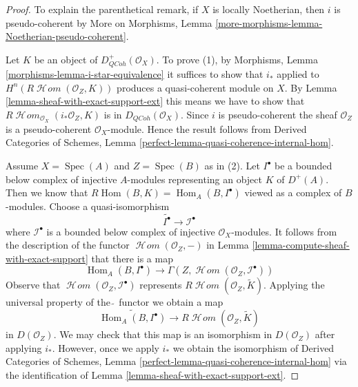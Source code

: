 \documentclass[10pt,a4paper]{amsart}
\theoremstyle{plain}
\theoremstyle{definition}
\theoremstyle{remark}
\numberwithin{equation}{subsection}
\def\Spec{\mathop{\mathrm{Spec}}}
\def\Hom{\mathop{\mathrm{Hom}}\nolimits}
\def\SheafHom{\mathop{\mathcal{H}\!\mathit{om}}\nolimits}
\def\QCoh{\mathit{QCoh}}
\begin{document}
\begin{proof}
To explain the parenthetical remark, if $X$ is locally Noetherian, then
$i$ is pseudo-coherent by
More on Morphisms, Lemma \ref{more-morphisms-lemma-Noetherian-pseudo-coherent}.

\medskip\noindent
Let $K$ be an object of $D^+_\QCoh(\mathcal{O}_X)$. To prove (1), by
Morphisms, Lemma \ref{morphisms-lemma-i-star-equivalence}
it suffices to show that $i_*$ applied to
$H^n(R\SheafHom(\mathcal{O}_Z, K))$ produces a
quasi-coherent module on $X$. By
Lemma \ref{lemma-sheaf-with-exact-support-ext}
this means we have to show that
$R\SheafHom_{\mathcal{O}_X}(i_*\mathcal{O}_Z, K)$
is in $D_\QCoh(\mathcal{O}_X)$. Since $i$ is pseudo-coherent
the sheaf $\mathcal{O}_Z$ is a pseudo-coherent $\mathcal{O}_X$-module.
Hence the result follows from
Derived Categories of Schemes, Lemma
\ref{perfect-lemma-quasi-coherence-internal-hom}.

\medskip\noindent
Assume $X = \Spec(A)$ and $Z = \Spec(B)$ as in (2).
Let $I^\bullet$ be a bounded below complex of injective $A$-modules
representing an object $K$ of $D^+(A)$.
Then we know that $R\Hom(B, K) = \Hom_A(B, I^\bullet)$ viewed
as a complex of $B$-modules. Choose a quasi-isomorphism
$$
\widetilde{I^\bullet} \longrightarrow \mathcal{I}^\bullet
$$
where $\mathcal{I}^\bullet$ is a bounded below complex of injective
$\mathcal{O}_X$-modules. It follows from the description of
the functor $\SheafHom(\mathcal{O}_Z, -)$ in
Lemma \ref{lemma-compute-sheaf-with-exact-support}
that there is a map
$$
\Hom_A(B, I^\bullet)
\longrightarrow
\Gamma(Z, \SheafHom(\mathcal{O}_Z, \mathcal{I}^\bullet))
$$
Observe that $\SheafHom(\mathcal{O}_Z, \mathcal{I}^\bullet)$
represents $R\SheafHom(\mathcal{O}_Z, \widetilde{K})$.
Applying the universal property of the $\widetilde{\ }$ functor we
obtain a map
$$
\widetilde{\Hom_A(B, I^\bullet)}
\longrightarrow
R\SheafHom(\mathcal{O}_Z, \widetilde{K})
$$
in $D(\mathcal{O}_Z)$. We may check that this map is an isomorphism in
$D(\mathcal{O}_Z)$ after applying $i_*$. However, once we apply
$i_*$ we obtain the isomorphism of Derived Categories of Schemes,
Lemma \ref{perfect-lemma-quasi-coherence-internal-hom}
via the identification of
Lemma \ref{lemma-sheaf-with-exact-support-ext}.
\end{proof}
\end{document}
